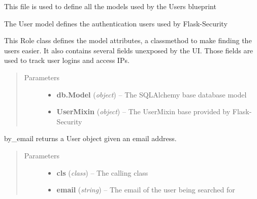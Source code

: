\documentclass[letterpaper,10pt,english]{sphinxmanual}
\begin{document}
This file is used to define all the models used by the Users blueprint

\begin{fulllineitems}
\label{dev-patients:cagenix.patients.models.Patient}
The User model defines the authentication users used by Flask-Security

This Role class defines the model attributes, a classmethod to make finding
the users easier. It also contains several fields unexposed by the UI. Those
fields are used to track user logins and access IPs.
\begin{quote}\begin{description}
\item[{Parameters}] \leavevmode\begin{itemize}
\item {} 
\textbf{db.Model} (\emph{object}) -- The SQLAlchemy base database model

\item {} 
\textbf{UserMixin} (\emph{object}) -- The UserMixin base provided by Flask-Security

\end{itemize}

\end{description}\end{quote}

\begin{fulllineitems}
\label{dev-patients:cagenix.patients.models.Patient.by_email}
by\_email returns a User object given an email address.
\begin{quote}\begin{description}
\item[{Parameters}] \leavevmode\begin{itemize}
\item {} 
\textbf{cls} (\emph{class}) -- The calling class

\item {} 
\textbf{email} (\emph{string}) -- The email of the user being searched for

\end{itemize}

\end{description}\end{quote}


\end{fulllineitems}
\end{fulllineitems}
\end{document}
